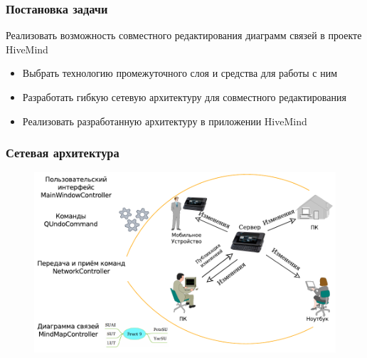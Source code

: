 \documentclass[unicode]{beamer}
\begin{document}
\begin{frame}
\begin{figure}[h!]
\begin{minipage}[h]{0.45\linewidth}
\end{minipage}
\hfill
\begin{minipage}[h]{0.45\linewidth}
\end{minipage}
\end{figure}
\end{frame}


\begin{frame}
\transwipe[direction=90]
\frametitle{Постановка задачи}
Реализовать возможность совместного редактирования диаграмм связей в проекте
HiveMind

\begin{itemize}
  \item Выбрать технологию промежуточного слоя и средства для работы с ним
  \item Разработать гибкую сетевую архитектуру для совместного редактирования
  \item Реализовать разработанную архитектуру в приложении HiveMind
\end{itemize}
\end{frame}


\begin{frame}
\transwipe[direction=90]
\frametitle{Сетевая архитектура}
\begin{figure}[h!] 
\centering
\includegraphics[width=\linewidth]{application-layers-improved} 
\end{figure}
\end{frame}
\end{document}
